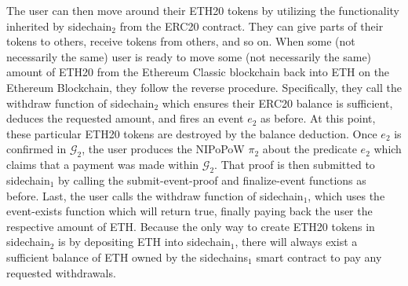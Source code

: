The user can then move around their ETH20 tokens by utilizing the functionality
inherited by \textsf{sidechain}$_2$ from the \textsf{ERC20} contract. They can
give parts of their tokens to others, receive tokens from others, and so on.
When some (not necessarily the same) user is ready to move some (not necessarily
the same) amount of ETH20 from the Ethereum Classic blockchain back into ETH
on the Ethereum Blockchain, they follow the reverse procedure. Specifically,
they call the \textsf{withdraw} function of \textsf{sidechain}$_2$ which ensures
their ERC20 balance is sufficient, deduces the requested amount, and fires an
event $e_2$ as before. At this point, these particular ETH20 tokens are
destroyed by the balance deduction. Once $e_2$ is confirmed in $\mathcal{G}_2$,
the user produces the NIPoPoW $\pi_2$ about the predicate $e_2$ which claims
that a payment was made within $\mathcal{G}_2$. That proof is then submitted to
\textsf{sidechain}$_1$ by calling the \textsf{submit-event-proof} and
\textsf{finalize-event} functions as before. Last, the user calls the
\textsf{withdraw} function of \textsf{sidechain}$_1$, which uses the
\textsf{event-exists} function which will return \textsf{true}, finally paying
back the user the respective amount of ETH. Because the only way to create ETH20
tokens in \textsf{sidechain}$_2$ is by depositing ETH into
\textsf{sidechain}$_1$, there will always exist a sufficient balance of ETH
owned by the \textsf{sidechains}$_1$ smart contract to pay any requested
withdrawals.

